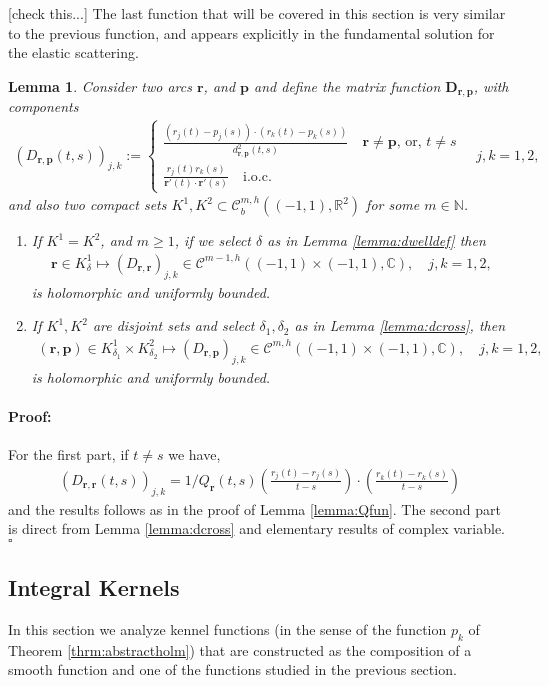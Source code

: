 \documentclass{article}
\newtheorem{lemma}[theorem]{Lemma}
\newenvironment{proof}{\paragraph{Proof:}}{\hfill$\square$}
\newcommand{\todo}[1]{{\color{red}[#1]}}
\newcommand{\IC}{{\mathbb C}}
\newcommand{\IN}{{\mathbb N}}
\newcommand{\IR}{{\mathbb R}}
\newcommand{\bp}{{\bm p}}
\newcommand{\cmspaceh}[4]{\mathcal{C}^{#1,#2} \left( #3, #4 \right)}
\newcommand{\rgeoh}[2]{\mathcal{C}_b^{#1,#2}\left( (-1,1), \IR^2 \right)}
\newcommand{\br}{\bm{r}}
\begin{document}
\todo{check this...}
The last function that will be covered in this section is very similar to the previous function, and appears explicitly in the fundamental solution for the elastic scattering.

\begin{lemma}
\label{lemma:Dmatrix}
Consider two arcs $\br$, and $\bp$ and define the matrix function $\mathbf{D}_{\br,\bp}$, with components
\begin{align*}
(D_{\br,\bp}(t,s))_{j,k} :=  \begin{cases}
\frac{(r_j(t)-p_j(s))\cdot (r_k(t)-p_k(s))}{d_{\br,\bp}^2(t,s)} \quad \br \neq \bp\text{, or, } t \neq s \\
\frac{r_j(t) r_k(s)}{\br'(t)\cdot \br'(s)} \quad \text{i.o.c.} 
\end{cases} \quad j,k=1,2,
\end{align*} 
and also two compact sets $K^1,K^2 \subset \rgeoh{m}{h}$ for some $m \in \IN$. 
\begin{enumerate}
\item
If $K^1 = K^2$, and $m \geq 1$, if we select $\delta$ as in Lemma \ref{lemma:dwelldef} then 
\begin{align*}
\br \in K^1_\delta \mapsto ({D}_{\br,\br})_{j,k} \in \cmspaceh{m-1}{h}{(-1,1)\times(-1,1)}{\IC}, \quad j,k =1,2,
\end{align*} 
is holomorphic and uniformly bounded.
\item 
If $K^1, K^2$ are disjoint sets and select $\delta_1, \delta_2$ as in Lemma \ref{lemma:dcross}, then 
\begin{align*}
(\br,\bp)  \in K^1_{\delta_1} \times K^2_{\delta_2} \mapsto ({D}_{\br,\bp})_{j,k} \in \cmspaceh{m}{h}{(-1,1)\times(-1,1)}{\IC}, \quad j,k =1,2,
\end{align*} 
is holomorphic and uniformly bounded.
\end{enumerate}
\end{lemma} 
\begin{proof}
For the first part, if $t \neq s$ we have, 
\begin{align*}
(D_{\br,\br}(t,s))_{j,k} = 1/Q_{\br}(t,s) \left( \frac{r_j(t)-r_j(s)}{t-s} \right) \cdot \left( \frac{r_k(t)-r_k(s)}{t-s} \right)
\end{align*}
and the results follows as in the proof of Lemma \ref{lemma:Qfun}.
The second part is direct from Lemma \ref{lemma:dcross} and elementary results of complex variable. 
\end{proof}
\subsection{Integral Kernels}
In this section we analyze kennel functions (in the sense of the function $p_k$ of Theorem \ref{thrm:abstractholm}) that are constructed as the composition of a smooth function and one of the functions studied in the previous section. 
\end{document}
